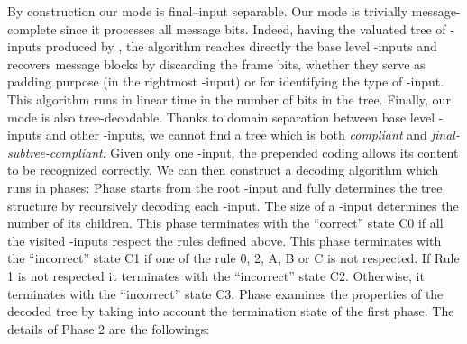 \documentclass{llncs}
\begin{document}
By construction our mode
is final--input separable. Our mode is trivially message-complete since it processes all message bits. Indeed, 
having the valuated tree of -inputs produced by , the algorithm  reaches directly the base level -inputs and recovers 
message blocks by discarding the frame bits, whether they serve as padding purpose (in the rightmost -input) or for identifying the type of -input.  
This algorithm runs in linear time in the number of bits in the tree.
Finally, our mode is also tree-decodable. Thanks to domain separation between base level -inputs and other -inputs, 
we cannot find a tree 
which is both \emph{compliant} and \emph{final-subtree-compliant}.
Given only one -input, the prepended coding allows its content to be recognized correctly. We can then construct a decoding algorithm  which runs 
in  phases: 
Phase  starts from the root -input and fully determines the tree structure by recursively decoding each -input. The size of a -input determines the 
number of its children. This phase terminates with the ``correct'' state C0 if all the visited -inputs respect the rules defined above.
This phase terminates with the ``incorrect'' state C1 if one of the rule 0, 2, A, B or C is not respected. 
If Rule 1 is not respected it terminates with the ``incorrect'' state C2. Otherwise, it terminates with the ``incorrect'' state C3.
Phase  examines the properties of 
the decoded tree by taking into account the termination state of the first phase. The details of Phase 2 are the followings:
\end{document}
